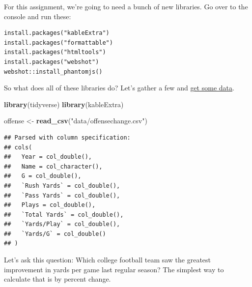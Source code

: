 \documentclass[]{book}
\newenvironment{Shaded}{\begin{snugshade}}{\end{snugshade}}
\newcommand{\KeywordTok}[1]{\textcolor[rgb]{0.13,0.29,0.53}{\textbf{#1}}}
\newcommand{\NormalTok}[1]{#1}
\newcommand{\StringTok}[1]{\textcolor[rgb]{0.31,0.60,0.02}{#1}}
\begin{document}
For this assignment, we're going to need a bunch of new libraries. Go over to the console and run these:

\begin{verbatim}
install.packages("kableExtra")
install.packages("formattable")
install.packages("htmltools")
install.packages("webshot")
webshot::install_phantomjs()
\end{verbatim}

So what does all of these libraries do? Let's gather a few and \href{https://unl.box.com/s/g3eeuogx8bog72ig28enuakhpdlbn394}{get some data}.

\begin{Shaded}
\begin{Highlighting}[]
\KeywordTok{library}\NormalTok{(tidyverse)}
\KeywordTok{library}\NormalTok{(kableExtra)}
\end{Highlighting}
\end{Shaded}

\begin{Shaded}
\begin{Highlighting}[]
\NormalTok{offense <-}\StringTok{ }\KeywordTok{read_csv}\NormalTok{(}\StringTok{"data/offensechange.csv"}\NormalTok{)}
\end{Highlighting}
\end{Shaded}

\begin{verbatim}
## Parsed with column specification:
## cols(
##   Year = col_double(),
##   Name = col_character(),
##   G = col_double(),
##   `Rush Yards` = col_double(),
##   `Pass Yards` = col_double(),
##   Plays = col_double(),
##   `Total Yards` = col_double(),
##   `Yards/Play` = col_double(),
##   `Yards/G` = col_double()
## )
\end{verbatim}

Let's ask this question: Which college football team saw the greatest improvement in yards per game last regular season? The simplest way to calculate that is by percent change.
\end{document}
